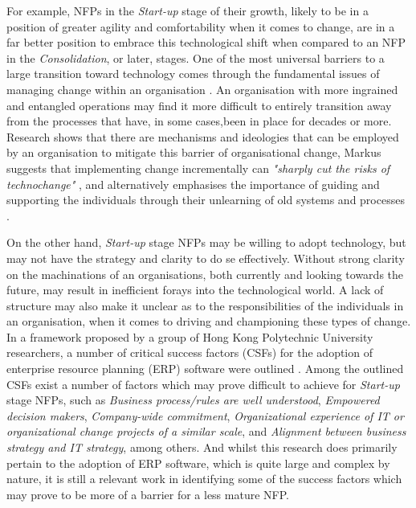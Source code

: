 For example, NFPs in the \emph{Start-up} stage of their growth, likely to be in a position of greater agility and comfortability when it comes to change, are in a far better position to embrace this technological shift when compared to an NFP in the \emph{Consolidation}, or later, stages. One of the most universal barriers to a large transition toward technology comes through the fundamental issues of managing change within an organisation \cite{o2007towards} \cite{schein1994management}. An organisation with more ingrained and entangled operations may find it more difficult to entirely transition away from the processes that have, in some cases,been in place for decades or more. Research shows that there are mechanisms and ideologies that can be employed by an organisation to mitigate this barrier of organisational change, Markus suggests that implementing change incrementally can \emph{"sharply cut the risks of technochange"} \cite{markus2004technochange}, and alternatively emphasises the importance of guiding and supporting the individuals through their unlearning of old systems and processes \cite{becker2010facilitating}.

On the other hand, \emph{Start-up} stage NFPs may be willing to adopt technology, but may not have the strategy and clarity to do se effectively. Without strong clarity on the machinations of an organisations, both currently and looking towards the future, may result in inefficient forays into the technological world. A lack of structure may also make it unclear as to the responsibilities of the individuals in an organisation, when it comes to driving and championing these types of change. In a framework proposed by a group of Hong Kong Polytechnic University researchers, a number of critical success factors (CSFs) for the adoption of enterprise resource planning (ERP) software were outlined \cite{ngai2008examining}. Among the outlined CSFs exist a number of factors which may prove difficult to achieve for \emph{Start-up} stage NFPs, such as \emph{Business process/rules are well understood}, \emph{Empowered decision makers}, \emph{Company-wide commitment}, \emph{Organizational experience of IT or organizational change projects of a similar scale}, and \emph{Alignment between business strategy and IT strategy}, among others. And whilst this research does primarily pertain to the adoption of ERP software, which is quite large and complex by nature, it is still a relevant work in identifying some of the success factors which may prove to be more of a barrier for a less mature NFP.

